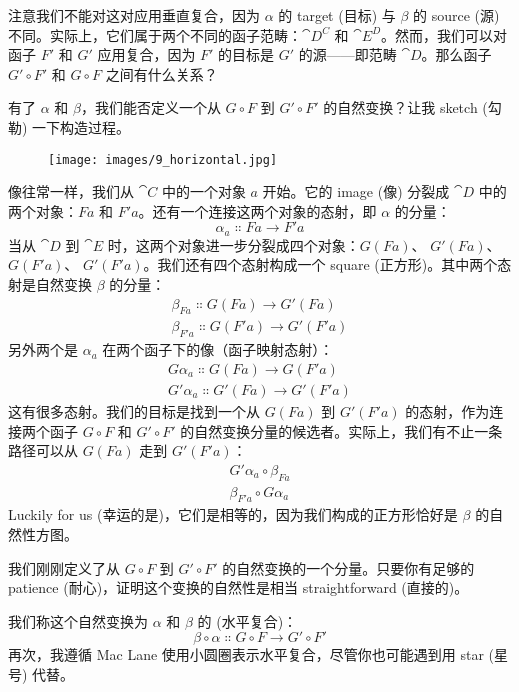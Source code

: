 \noindent
注意我们不能对这对应用垂直复合，因为 $\alpha$ 的 target (目标) 与 $\beta$ 的 source (源) 不同。实际上，它们属于两个不同的函子范畴：$\cat{D^C}$ 和 $\cat{E^D}$。然而，我们可以对函子 $F'$ 和 $G'$ 应用复合，因为 $F'$ 的目标是 $G'$ 的源——即范畴 $\cat{D}$。那么函子 $G' \circ F'$ 和 $G \circ F$ 之间有什么关系？

有了 $\alpha$ 和 $\beta$，我们能否定义一个从 $G \circ F$ 到 $G' \circ F'$ 的自然变换？让我 sketch (勾勒) 一下构造过程。

\begin{figure}[H]
  \centering
  \texttt{[image: images/9\_horizontal.jpg]}
\end{figure}

\noindent
像往常一样，我们从 $\cat{C}$ 中的一个对象 $a$ 开始。它的 image (像) 分裂成 $\cat{D}$ 中的两个对象：$F a$ 和 $F'a$。还有一个连接这两个对象的态射，即 $\alpha$ 的分量：
\[\alpha_a \Colon F a \to F'a\]
当从 $\cat{D}$ 到 $\cat{E}$ 时，这两个对象进一步分裂成四个对象：$G (F a)$、 $G'(F a)$、 $G (F'a)$、 $G'(F'a)$。我们还有四个态射构成一个 square (正方形)。其中两个态射是自然变换 $\beta$ 的分量：
\begin{gather*}
  \beta_{F a} \Colon G (F a) \to G'(F a) \\
  \beta_{F'a} \Colon G (F'a) \to G'(F'a)
\end{gather*}
另外两个是 $\alpha_a$ 在两个函子下的像（函子映射态射）：
\begin{gather*}
  G \alpha_a \Colon G (F a) \to G (F'a) \\
  G'\alpha_a \Colon G'(F a) \to G'(F'a)
\end{gather*}
这有很多态射。我们的目标是找到一个从 $G (F a)$ 到 $G'(F'a)$ 的态射，作为连接两个函子 $G \circ F$ 和 $G' \circ F'$ 的自然变换分量的候选者。实际上，我们有不止一条路径可以从 $G (F a)$ 走到 $G'(F'a)$：
\begin{gather*}
  G'\alpha_a \circ \beta_{F a} \\
  \beta_{F'a} \circ G \alpha_a
\end{gather*}
Luckily for us (幸运的是)，它们是相等的，因为我们构成的正方形恰好是 $\beta$ 的自然性方图。

我们刚刚定义了从 $G \circ F$ 到 $G' \circ F'$ 的自然变换的一个分量。只要你有足够的 patience (耐心)，证明这个变换的自然性是相当 straightforward (直接的)。

我们称这个自然变换为 $\alpha$ 和 $\beta$ 的  (水平复合)：
\[\beta \circ \alpha \Colon G \circ F \to G' \circ F'\]
再次，我遵循 Mac Lane 使用小圆圈表示水平复合，尽管你也可能遇到用 star (星号) 代替。

